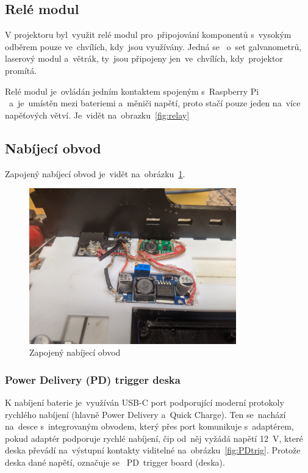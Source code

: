 \subsection{Relé modul}
V projektoru  byl~využit relé modul  pro~připojování komponentů  s~vysokým odběrem pouze ve~chvílích,  kdy~jsou využívány. Jedná se ~o~set galvanometrů, laserový modul  a~větrák, ty~jsou připojeny  jen~ve~chvílích,  kdy~projektor promítá.

Relé modul je~ovládán jedním kontaktem spojeným  s~Raspberry Pi ~a~je~umístěn mezi bateriemi  a~měniči napětí, proto stačí pouze jeden na~více napěťových větví. Je~vidět na~obrazku~\ref{fig:relay}

\subsection{Nabíjecí obvod}
Zapojený nabíjecí obvod je~vidět na~obrázku~\ref{fig:hw_charging_circuit}.

\begin{figure}[htb]
  \centering
  \includegraphics[width=0.8\textwidth]{img/hw_charging_circuit.jpg}
  \caption{\label{fig:hw_charging_circuit} Zapojený nabíjecí obvod}
\end{figure}

\subsubsection{Power Delivery (PD) trigger deska}
K nabíjení baterie je~využíván USB-C port podporující moderní protokoly rychlého nabíjení (hlavně Power Delivery  a~Quick Charge).
Ten se~nachází na~desce  s~integrovaným obvodem, který přes port komunikuje  s~adaptérem, pokud adaptér podporuje rychlé nabíjení, čip od~něj vyžádá napětí 12~V, které deska převádí na~výstupní kontakty viditelné na~obrázku~\ref{fig:PDtrig}. Protože deska  dané napětí, označuje se ~PD~trigger board (deska).


